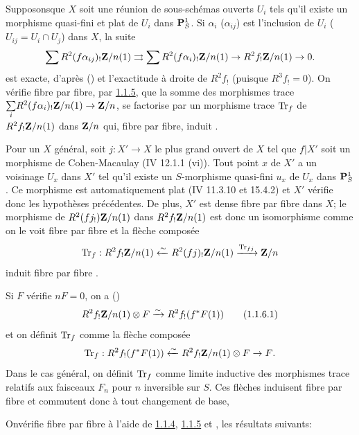 \documentclass[10pt]{../fichiers-configuration-latex/smfart}
\begin{document}
Supposons\pageoriginale que $X$ soit
une réunion de sous-schémas ouverts $U_{i}$ tels qu'il existe un
morphisme quasi-fini et plat de $U_{i}$ dans $\mathbf{P}^{1}_S$. Si
$\alpha_{i}$ (\resp $\alpha_{ij}$) est l'inclusion de $U_{i}$ (\resp
$U_{ij}=U_{i}\cap U_{j}$) dans $X$, la suite
$$
\sum R^{2}(f\alpha_{ij})_{!}\mathbf{Z}/n(1)\rightrightarrows
\sum R^2(f\alpha_{i})_{!}\mathbf{Z}/n(1)\rightarrow
R^{2}f_{!}\mathbf{Z}/n(1)\rightarrow 0{}.
$$
est exacte, d'après () et l'exactitude à droite de
$R^{2}f_{!}$ (puisque $R^{3}f_{!}=0$). On vérifie fibre par fibre, par
\hyperref[XVIII.lem1.1.5]{1.1.5}, que la somme des morphismes trace
$\underset{i}\sum R^{2}(f\alpha_{i})_{!}\mathbf{Z}/n(1)\rightarrow
\mathbf{Z}/n$, se factorise par un morphisme trace $\operatorname{Tr}_{f}$ de
$R^{2}f_{!}\mathbf{Z}/n(1)$ dans $\mathbf{Z}/n$ qui, fibre par fibre, induit
.

Pour un $X$ général, soit $j:X'\rightarrow X$ le plus grand ouvert de
$X$ tel que $f|X'$ soit un morphisme de Cohen-Macaulay (\cf \EGA IV
12.1.1 (vi)). Tout point $x$ de $X'$ a un voisinage $U_{x}$ dans $X'$
tel qu'il existe un $S$-morphisme quasi-fini $u_{x}$ de $U_{x}$ dans
$\mathbf{P}^{1}_{S}$. Ce morphisme est automatiquement plat (\EGA IV
11.3.10 et 15.4.2) et $X'$ vérifie donc les hypothèses précédentes. De
plus, $X'$ est dense fibre par fibre dans $X$; le morphisme de
$R^{2}(fj_{!})\mathbf{Z}/n(1)$ dans $R^{2}f_{!}\mathbf{Z}/n(1)$ est
donc un isomorphisme comme on le voit fibre par fibre et la flèche
composée
$$
\operatorname{Tr}_{f}:R^{2}f_{!}\mathbf{Z}/n(1)\xleftarrow{\sim}
R^{2}(fj)_{!}\mathbf{Z}/n(1)\xrightarrow{\operatorname{Tr}_{fj}}\mathbf{Z}/n
$$
induit fibre par fibre .

Si $F$ vérifie $nF=0$, on a ()
\begin{equation*}
R^{2}f_{!}\mathbf{Z}/n(1)\otimes F\xrightarrow{\sim}
R^{2}f_{!}(f^{\ast}F(1))\tag{1.1.6.1} 
\end{equation*}%
et on définit $\operatorname{Tr}_{f}$ comme la flèche composée
$$
\operatorname{Tr}_{f}:R^{2}f_{!}(f^{\ast}F(1))\xleftarrow{\sim}
R^{2}f_{!}\mathbf{Z}/n(1) \otimes F\rightarrow F{}.
$$
Dans le cas général, on définit $\operatorname{Tr}_{f}$ comme limite inductive des
morphismes trace relatifs aux faisceaux $F_n$ pour $n$ inversible
sur $S$. Ces flèches induisent fibre par fibre  et commutent
donc à tout changement de base, \cqfd

On\pageoriginale vérifie fibre par fibre à l'aide de
\hyperref[XVIII.lem1.1.4]{1.1.4}, \hyperref[XVIII.lem1.1.5]{1.1.5} et , les
résultats suivants:
\end{document}
